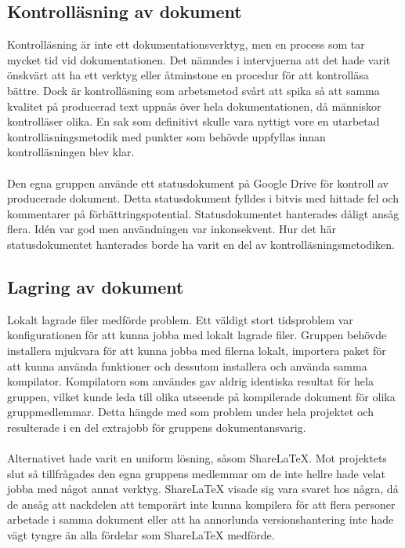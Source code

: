 \subsection{Kontrolläsning av dokument}
Kontrolläsning är inte ett dokumentationsverktyg, men en process som tar mycket tid vid dokumentationen. Det nämndes i intervjuerna att det hade varit önskvärt att ha ett verktyg eller åtminstone en procedur för att kontrolläsa bättre. Dock är kontrolläsning som arbetsmetod svårt att spika så att samma kvalitet på producerad text uppnås över hela dokumentationen, då människor kontrolläser olika. En sak som definitivt skulle vara nyttigt vore en utarbetad kontrolläsningsmetodik med punkter som behövde uppfyllas innan kontrolläsningen blev klar.
\\ \\
Den egna gruppen använde ett statusdokument på Google Drive för kontroll av producerade dokument. Detta statusdokument fylldes i bitvis med hittade fel och kommentarer på förbättringspotential. Statusdokumentet hanterades dåligt ansåg flera. Idén var god men användningen var inkonsekvent. Hur det här statusdokumentet hanterades borde ha varit en del av kontrolläsningsmetodiken.

\subsection{Lagring av dokument}
\label{subsec:wassing-document-storage}
Lokalt lagrade filer medförde problem. Ett väldigt stort tidsproblem var konfigurationen för att kunna jobba med lokalt lagrade filer. Gruppen behövde installera mjukvara för att kunna jobba med filerna lokalt, importera paket för att kunna använda funktioner och dessutom installera och använda samma kompilator. Kompilatorn som användes gav aldrig identiska resultat för hela gruppen, vilket kunde leda till olika utseende på kompilerade dokument för olika gruppmedlemmar. Detta hängde med som problem under hela projektet och resulterade i en del extrajobb för gruppens dokumentansvarig. 
\\ \\
Alternativet hade varit en uniform lösning, såsom ShareLaTeX. Mot projektets slut så tillfrågades den egna gruppens medlemmar om de inte hellre hade velat jobba med något annat verktyg. ShareLaTeX visade sig vara svaret hos några, då de ansåg att nackdelen att temporärt inte kunna kompilera för att flera personer arbetade i samma dokument eller att ha annorlunda versionshantering inte hade vägt tyngre än alla fördelar som ShareLaTeX medförde.

